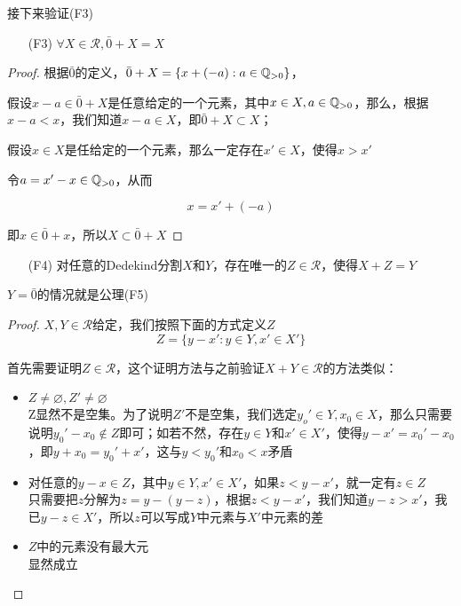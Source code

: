 接下来验证(F3)

\begin{itemize}
    \item[(F3)] $\forall X\in \mathcal{R},\bar{0}+X=X$
\end{itemize}

\begin{proof}
    根据$\bar{0}$的定义，$\bar{0}+X=\{x+(-a):a\in \mathbb{Q}_{>0}\}$，
    
    假设$x-a\in \bar{0}+X$是任意给定的一个元素，其中$x\in X,a\in \mathbb{Q}_{>0}$，那么，根据$x-a<x$，我们知道$x-a\in X$，即$\bar{0}+X\subset X$；

    假设$x\in X$是任给定的一个元素，那么一定存在$x'\in X$，使得$x>x'$

    令$a=x'-x\in\mathbb{Q}_{>0}$，从而

    \begin{equation*}
        x=x'+(-a)
    \end{equation*}

    即$x\in \bar{0}+x$，所以$X\subset \bar{0}+X$
\end{proof}

\begin{itemize}
    \item[(F4)] 对任意的Dedekind分割$X$和$Y$，存在唯一的$Z\in \mathcal{R}$，使得$X+Z=Y$ 
\end{itemize}

$Y=\bar{0}$的情况就是公理(F5)

\begin{proof}
    $X,Y\in\mathcal{R}$给定，我们按照下面的方式定义$Z$
    \begin{equation*}
        Z=\{y-x':y\in Y,x' \in X' \}
    \end{equation*}

    首先需要证明$Z\in \mathcal{R}$，这个证明方法与之前验证$X+Y\in\mathcal{R}$的方法类似：

    \begin{itemize}
        \item $Z\neq \varnothing,Z' \neq \varnothing$ \\
        Z显然不是空集。为了说明$Z'$不是空集，我们选定$y_o'\in Y,x_0\in X$，那么只需要说明$y_0'-x_0\notin Z$即可；如若不然，存在$y\in Y$和$x'\in X'$，使得$y-x' = x_0'-x_0$，即$y+x_0=y_0'+x'$，这与$y<y_0'$和$x_0<x$矛盾
        \item 对任意的$y-x\in Z$，其中$y\in Y,x'\in X'$，如果$z<y-x'$，就一定有$z\in Z$\\
        只需要把$z$分解为$z=y-(y-z)$，根据$z<y-x'$，我们知道$y-z>x'$，我已$y-z\in X'$，所以$z$可以写成$Y$中元素与$X'$中元素的差
        \item $Z$中的元素没有最大元\\
        显然成立
    \end{itemize}
\end{proof}
